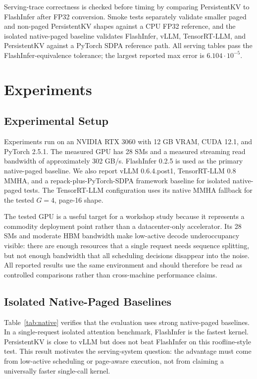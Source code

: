 \documentclass[10pt]{article}
\begin{document}
Serving-trace correctness is checked before timing by comparing PersistentKV
to FlashInfer after FP32 conversion. Smoke tests separately validate smaller
paged and non-paged PersistentKV shapes against a CPU FP32 reference, and the
isolated native-paged baseline validates FlashInfer, vLLM, TensorRT-LLM, and
PersistentKV against a PyTorch SDPA reference path. All serving tables pass the
FlashInfer-equivalence tolerance; the largest reported max error is
$6.104\cdot 10^{-5}$.

\section{Experiments}

\subsection{Experimental Setup}

Experiments run on an NVIDIA RTX 3060 with 12 GB VRAM, CUDA 12.1, and PyTorch
2.5.1. The measured GPU has 28 SMs and a measured streaming read bandwidth of
approximately 302 GB/s. FlashInfer 0.2.5 is used as the primary native-paged
baseline. We also report vLLM 0.6.4.post1, TensorRT-LLM 0.8 MMHA, and a
repack-plus-PyTorch-SDPA framework baseline for isolated native-paged tests.
The TensorRT-LLM configuration uses its native MMHA fallback for the tested
$G=4$, page-16 shape.

The tested GPU is a useful target for a workshop study because it represents a
commodity deployment point rather than a datacenter-only accelerator. Its 28
SMs and moderate HBM bandwidth make low-active decode underoccupancy visible:
there are enough resources that a single request needs sequence splitting, but
not enough bandwidth that all scheduling decisions disappear into the noise.
All reported results use the same environment and should therefore be read as
controlled comparisons rather than cross-machine performance claims.

\subsection{Isolated Native-Paged Baselines}

Table~\ref{tab:native} verifies that the evaluation uses strong native-paged
baselines. In a single-request isolated attention benchmark, FlashInfer is the
fastest kernel. PersistentKV is close to vLLM but does not beat FlashInfer on
this roofline-style test. This result motivates the serving-system question:
the advantage must come from low-active scheduling or page-aware execution, not
from claiming a universally faster single-call kernel.
\end{document}
